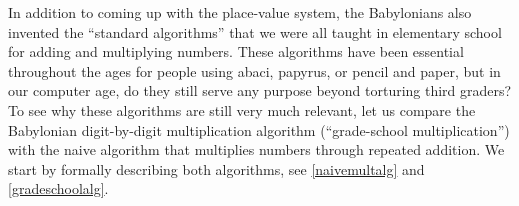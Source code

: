 In addition to coming up with the place-value system, the Babylonians
also invented the ``standard algorithms'' that we were all taught in
elementary school for adding and multiplying numbers. These algorithms
have been essential throughout the ages for people using abaci, papyrus,
or pencil and paper, but in our computer age, do they still serve any
purpose beyond torturing third graders? To see why these algorithms are
still very much relevant, let us compare the Babylonian digit-by-digit
multiplication algorithm (``grade-school multiplication'') with the
naive algorithm that multiplies numbers through repeated addition. We
start by formally describing both algorithms, see \cref{naivemultalg}
and \cref{gradeschoolalg}.



